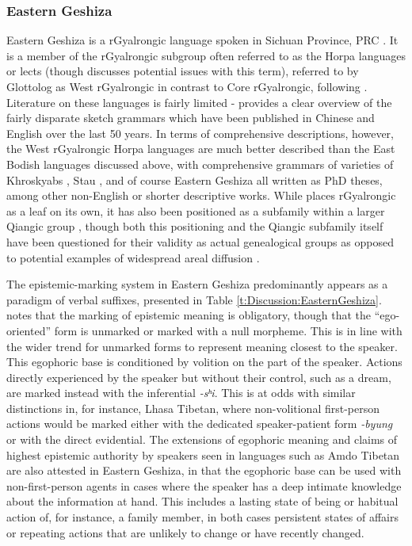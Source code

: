 

\subsubsection{Eastern Geshiza}\label{ss:Discussion:EasternGeshiza}
Eastern Geshiza is a rGyalrongic language spoken in Sichuan Province, PRC \cite{Honkasalo2019}. It is a member of the rGyalrongic subgroup often referred to as the Horpa languages or lects (though  discusses potential issues with this term), referred to by Glottolog \cite{glottolog} as West rGyalrongic in contrast to Core rGyalrongic, following \cite{Gates2012}. Literature on these languages is fairly limited -  provides a clear overview of the fairly disparate sketch grammars which have been published in Chinese and English over the last 50 years. In terms of comprehensive descriptions, however, the West rGyalrongic Horpa languages are much better described than the East Bodish languages discussed above, with comprehensive grammars of varieties of Khroskyabs \cite{Lai2017}, Stau \cites{Gates2021}{Tunzhi2019}, and of course Eastern Geshiza \cite{Honkasalo2019} all written as PhD theses, among other non-English or shorter descriptive works. While  places rGyalrongic as a leaf on its own, it has also been positioned as a subfamily within a larger Qiangic group \cite[15]{Honkasalo2019}, though both this positioning and the Qiangic subfamily itself have been questioned for their validity as actual genealogical groups as opposed to potential examples of widespread areal diffusion \cites{Honkasalo2019}{Chirkova2012}.

The epistemic-marking system in Eastern Geshiza predominantly appears as a paradigm of verbal suffixes, presented in Table \ref{t:Discussion:EasternGeshiza}.  notes that the marking of epistemic meaning is obligatory, though that the ``ego-oriented'' form is unmarked or marked with a null morpheme. This is in line with the wider trend for unmarked forms to represent meaning closest to the speaker. This egophoric base is conditioned by volition on the part of the speaker. Actions directly experienced by the speaker but without their control, such as a dream, are marked instead with the inferential \textit{-sʰi}. This is at odds with similar distinctions in, for instance, Lhasa Tibetan, where non-volitional first-person actions would be marked either with the dedicated speaker-patient form \textit{-byung} or with the direct evidential. The extensions of egophoric meaning and claims of highest epistemic authority by speakers seen in languages such as Amdo Tibetan \cite{Tribur2019} are also attested in Eastern Geshiza, in that the egophoric base can be used with non-first-person agents in cases where the speaker has a deep intimate knowledge about the information at hand. This includes a lasting state of being or habitual action of, for instance, a family member, in both cases persistent states of affairs or repeating actions that are unlikely to change or have recently changed.

